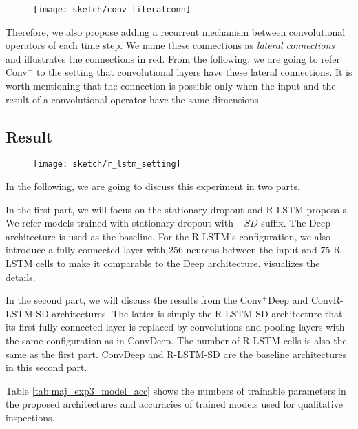  \begin{figure}
\centering
\texttt{[image: sketch/conv\_literalconn]}
\label{fig:conv_literalconn}
\end{figure}

	Therefore, we also propose adding a recurrent mechanism between convolutional operators of each time step. We name these connections as \textit{lateral connections} and \addfigure{\ref{fig:conv_literalconn}} illustrates the connections in red. From the following, we are going to refer Conv$^+$ to the setting that convolutional layers have these  lateral connections.  It is worth mentioning that the connection is possible only when the input and the result of a convolutional operator have the same dimensions.

\subsection{Result}

\begin{figure}
\centering
\texttt{[image: sketch/r\_lstm\_setting]}
\label{fig:rlstm_setting}
\end{figure}

In the following, we are going to discuss this experiment in two parts.

In the first part, we will focus on the stationary dropout and R-LSTM proposals. We refer models trained with stationary dropout with $-SD$ suffix. The Deep architecture is used as the baseline.  For the R-LSTM's configuration, we also introduce a fully-connected layer with 256 neurons between the input and 75 R-LSTM cells to make it comparable to the Deep architecture. \addfigure{\ref{fig:rlstm_setting}} visualizes the details.


In the second part, we will discuss the results from the Conv$^+$Deep and ConvR-LSTM-SD architectures. The latter  is simply the R-LSTM-SD architecture that its first fully-connected layer is replaced by convolutions and pooling layers with the same configuration as in ConvDeep. The number of R-LSTM cells is also the same as the first part. ConvDeep and R-LSTM-SD are the baseline architectures in this second part.


Table \ref{tab:maj_exp3_model_acc} shows the numbers of trainable parameters in the proposed architectures and accuracies of trained models used for qualitative inspections.

